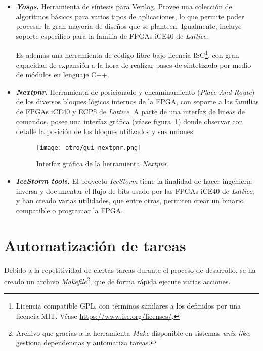 \begin{itemize}
    \item \textbf{\emph{Yosys}.} Herramienta de síntesis\cite{wolf2016yosys} para Verilog. Provee una colección de algoritmos básicos para varios tipos de aplicaciones, lo que permite poder procesar la gran mayoría de diseños que se planteen. Igualmente, incluye soporte especifico para la familia de FPGAs iCE40 de \emph{Lattice}.

    Es además una herramienta de código libre bajo licencia ISC\footnote{Licencia compatible GPL, con términos similares a los definidos por una licencia MIT. Véase \url{https://www.isc.org/licenses/}.}, con gran capacidad de expansión a la hora de realizar pases de sintetizado por medio de módulos en lenguaje C++.
    
    \item \textbf{\emph{Nextpnr}.} Herramienta de posicionado y encaminamiento (\emph{Place-And-Route}) de los diversos bloques lógicos internos de la FPGA, con soporte a las familias de FPGAs iCE40 y ECP5 de \emph{Lattice}. A parte de una interfaz de lineas de comandos, posee una interfaz gráfica (véase figura~\ref{fig:gui_nextpnr}) donde observar con detalle la posición de los bloques utilizados y sus uniones.
    
    \begin{figure}[htb]
        \centering
        \texttt{[image: otro/gui\_nextpnr.png]}
        \caption{Interfaz gráfica de la herramienta \emph{Nextpnr}.}
        \label{fig:gui_nextpnr}
    \end{figure}

    \item \textbf{\emph{IceStorm tools}.} El proyecto \emph{IceStorm} tiene la finalidad de hacer ingeniería inversa y documentar el flujo de bits usado por las FPGAs iCE40 de \emph{Lattice}, y han creado varias utilidades, que entre otras, permiten crear un binario compatible o programar la FPGA.   
\end{itemize}

\section{Automatización de tareas}
Debido a la repetitividad de ciertas tareas durante el proceso de desarrollo, se ha creado un archivo \emph{Makefile}\footnote{Archivo que gracias a la herramienta \emph{Make} disponible en sistemas \emph{unix-like}, gestiona dependencias y automatiza tareas.}, que de forma rápida ejecute varias acciones.

